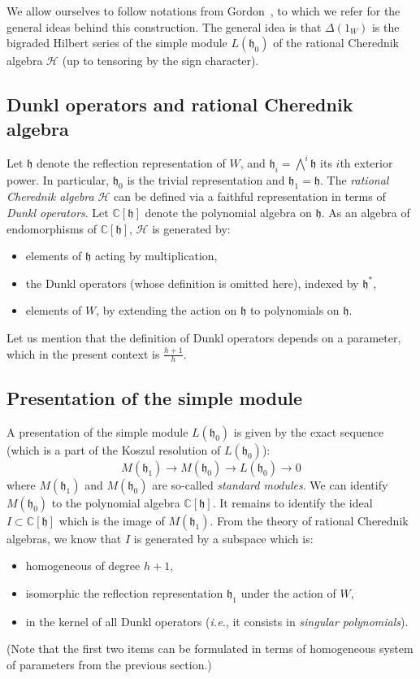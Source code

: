 \documentclass[11pt]{article}
\theoremstyle{definition}
\begin{document}
We allow ourselves to follow notations from Gordon~\cite{gordon}, to which we refer for the general ideas behind this construction.  The general idea is that $\varDelta(1_W)$ is the bigraded Hilbert series of the simple module $L(\mathfrak{h}_0)$ of the rational Cherednik algebra $\mathcal{H}$ (up to tensoring by the sign character).

\newcommand{\h}{\mathfrak{h}}
\renewcommand{\H}{\mathcal{H}}
\newcommand{\C}{\mathbb{C}}

\subsection{Dunkl operators and rational Cherednik algebra}

Let $\h$ denote the reflection representation of $W$, and $\h_i = \bigwedge^i \h$ its $i$th exterior power.  In particular, $\h_0$ is the trivial representation and $\h_1 = \h$.  The {\it rational Cherednik algebra} $\H$ can be defined via a faithful representation in terms of {\it Dunkl operators}.  Let $\C[\h]$ denote the polynomial algebra on $\h$.  As an algebra of endomorphisms of $\C[\h]$, $\H$ is generated by:
\begin{itemize}
    \item elements of $\h$ acting by multiplication, 
    \item the Dunkl operators (whose definition is omitted here), indexed by $\h^*$,
    \item elements of $W$, by extending the action on $\h$ to polynomials on $\h$.
\end{itemize}
Let us mention that the definition of Dunkl operators depends on a parameter, which in the present context is $\frac{h+1}{h}$. 

\subsection{Presentation of the simple module}

A presentation of the simple module $L(\mathfrak{h}_0)$ is given by the exact sequence (which is a part of the Koszul resolution of $L(\mathfrak{h}_0)$):
\[
    M(\mathfrak{h}_1) \to 
    M(\mathfrak{h}_0) \to 
    L(\mathfrak{h}_0) \to 0
\]
where $M(\mathfrak{h}_1)$ and $M(\mathfrak{h}_0)$ are so-called {\it standard modules}.  We can identify $M(\mathfrak{h}_0)$ to the polynomial algebra $\mathbb{C}[\mathfrak{h}]$.  It remains to identify the ideal $I \subset \mathbb{C}[\mathfrak{h}]$ which is the image of $M(\mathfrak{h}_1)$.  From the theory of rational Cherednik algebras, we know that $I$ is generated by a subspace which is:
\begin{itemize}
    \item homogeneous of degree $h+1$,
    \item isomorphic the reflection representation $\mathfrak{h}_1$ under the action of $W$,
    \item in the kernel of all Dunkl operators ({\it i.e.}, it consists in {\it singular polynomials}).
\end{itemize}
(Note that the first two items can be formulated in terms of  homogeneous system of parameters from the previous section.)  
\end{document}
